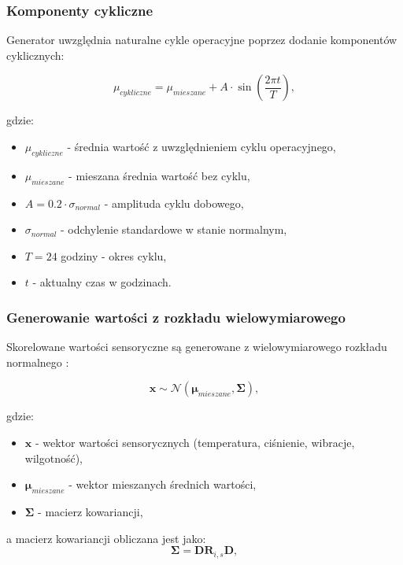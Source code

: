 \subsubsection{Komponenty cykliczne}

Generator uwzględnia naturalne cykle operacyjne poprzez dodanie komponentów cyklicznych:

\begin{equation}
\mu_{cykliczne} = \mu_{mieszane} + A \cdot \sin\left(\frac{2\pi t}{T}\right),
\end{equation}

gdzie:
\begin{itemize}
    \item $\mu_{cykliczne}$ - średnia wartość z uwzględnieniem cyklu operacyjnego,
    \item $\mu_{mieszane}$ - mieszana średnia wartość bez cyklu,
    \item $A = 0.2 \cdot \sigma_{normal}$ - amplituda cyklu dobowego,
    \item $\sigma_{normal}$ - odchylenie standardowe w stanie normalnym,
    \item $T = 24$ godziny - okres cyklu,
    \item $t$ - aktualny czas w godzinach.
\end{itemize}

\newpage

\subsubsection{Generowanie wartości z rozkładu wielowymiarowego}

Skorelowane wartości sensoryczne są generowane z wielowymiarowego rozkładu normalnego \cite{anderson_mva} :

\begin{equation}
\mathbf{x} \sim \mathcal{N}(\boldsymbol{\mu}_{mieszane}, \boldsymbol{\Sigma}),
\end{equation}

gdzie:
\begin{itemize}
    \item $\mathbf{x}$ - wektor wartości sensorycznych (temperatura, ciśnienie, wibracje, wilgotność),
    \item $\boldsymbol{\mu}_{mieszane}$ - wektor mieszanych średnich wartości,
    \item $\boldsymbol{\Sigma}$ - macierz kowariancji,
\end{itemize}

a macierz kowariancji obliczana jest jako:
\begin{equation}
\boldsymbol{\Sigma} = \mathbf{D} \mathbf{R}_{i,s} \mathbf{D},
\end{equation}

